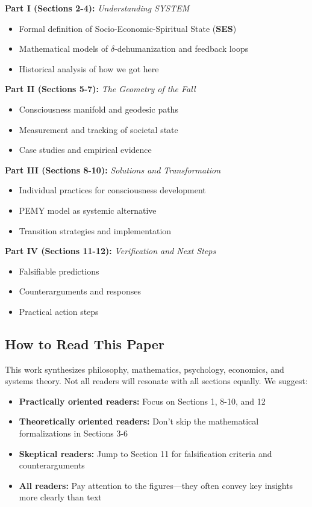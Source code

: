 \documentclass[11pt,a4paper]{article}
\newcommand{\SES}{\textbf{SES}}
\newcommand{\deltaDehum}{$\delta$-dehumanization}
\theoremstyle{definition}
\theoremstyle{remark}
\begin{document}
\textbf{Part I (Sections 2-4):} \textit{Understanding SYSTEM}
\begin{itemize}
    \item Formal definition of Socio-Economic-Spiritual State (\SES)
    \item Mathematical models of \deltaDehum{} and feedback loops
    \item Historical analysis of how we got here
\end{itemize}

\textbf{Part II (Sections 5-7):} \textit{The Geometry of the Fall}
\begin{itemize}
    \item Consciousness manifold and geodesic paths
    \item Measurement and tracking of societal state
    \item Case studies and empirical evidence
\end{itemize}

\textbf{Part III (Sections 8-10):} \textit{Solutions and Transformation}
\begin{itemize}
    \item Individual practices for consciousness development
    \item PEMY model as systemic alternative
    \item Transition strategies and implementation
\end{itemize}

\textbf{Part IV (Sections 11-12):} \textit{Verification and Next Steps}
\begin{itemize}
    \item Falsifiable predictions
    \item Counterarguments and responses
    \item Practical action steps
\end{itemize}

\subsection{How to Read This Paper}

This work synthesizes philosophy, mathematics, psychology, economics, and systems theory. Not all readers will resonate with all sections equally. We suggest:

\begin{itemize}
    \item \textbf{Practically oriented readers:} Focus on Sections 1, 8-10, and 12
    \item \textbf{Theoretically oriented readers:} Don't skip the mathematical formalizations in Sections 3-6
    \item \textbf{Skeptical readers:} Jump to Section 11 for falsification criteria and counterarguments
    \item \textbf{All readers:} Pay attention to the figures---they often convey key insights more clearly than text
\end{itemize}
\end{document}
